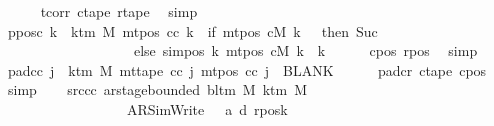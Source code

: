 \begin{isabellebody}
\ \ \ \ \isamarkupfalse%
\ tcorr\ c{\isacharunderscore}{\kern0pt}tape\ r{\isacharunderscore}{\kern0pt}tape\ \isamarkupfalse%
\ simp\isanewline
\ \ \isamarkupfalse%
\ ppos{\isacharunderscore}{\kern0pt}c{\isacharcolon}{\kern0pt}\ {\isachardoublequoteopen}{\isasymforall}k\ {\isacharless}{\kern0pt}\ k{\isacharunderscore}{\kern0pt}tm\ M{\isachardot}{\kern0pt}\ mt{\isacharunderscore}{\kern0pt}pos\ c{\isacharunderscore}{\kern0pt}c\ k\ {\isacharequal}{\kern0pt}\ {\isacharparenleft}{\kern0pt}if\ mt{\isacharunderscore}{\kern0pt}pos\ cM\ k\ {\isacharequal}{\kern0pt}\ {}\ then\ Suc\ {}\isanewline
\ \ \ \ \ \ \ \ \ \ \ \ \ \ \ \ \ \ \ else\ sim{\isacharunderscore}{\kern0pt}pos\ {\isacharquery}{\kern0pt}k\ {\isacharparenleft}{\kern0pt}mt{\isacharunderscore}{\kern0pt}pos\ cM\ k{\isacharparenright}{\kern0pt}\ {\isacharplus}{\kern0pt}\ {\isacharquery}{\kern0pt}k{\isacharparenright}{\kern0pt}{\isachardoublequoteclose}\isanewline
\ \ \ \ \isamarkupfalse%
\ c{\isacharunderscore}{\kern0pt}pos\ r{\isacharunderscore}{\kern0pt}pos\ \isamarkupfalse%
\ simp\isanewline
\ \ \isamarkupfalse%
\ pad{\isacharunderscore}{\kern0pt}cc{\isacharcolon}{\kern0pt}\ {\isachardoublequoteopen}{\isasymforall}j\ {\isasymge}\ k{\isacharunderscore}{\kern0pt}tm\ M{\isachardot}{\kern0pt}\ mt{\isacharunderscore}{\kern0pt}tape\ c{\isacharunderscore}{\kern0pt}c\ j\ {\isacharparenleft}{\kern0pt}mt{\isacharunderscore}{\kern0pt}pos\ c{\isacharunderscore}{\kern0pt}c\ j{\isacharparenright}{\kern0pt}\ {\isacharequal}{\kern0pt}\ BLANK{}{\isachardoublequoteclose}\isanewline
\ \ \ \ \isamarkupfalse%
\ pad{\isacharunderscore}{\kern0pt}cr\ c{\isacharunderscore}{\kern0pt}tape\ c{\isacharunderscore}{\kern0pt}pos\ \isamarkupfalse%
\ simp\isanewline
\ \ \isamarkupfalse%
\ src{\isacharunderscore}{\kern0pt}cc{\isacharcolon}{\kern0pt}\ {\isachardoublequoteopen}ar{\isacharunderscore}{\kern0pt}stage{\isacharunderscore}{\kern0pt}bounded\ {\isacharparenleft}{\kern0pt}bl{\isacharunderscore}{\kern0pt}tm\ M{\isacharparenright}{\kern0pt}\ {\isacharparenleft}{\kern0pt}k{\isacharunderscore}{\kern0pt}tm\ M{\isacharparenright}{\kern0pt}\isanewline
\ \ \ \ \ \ \ \ \ \ \ \ \ \ \ \ \ \ {\isacharparenleft}{\kern0pt}AR{\isacharunderscore}{\kern0pt}SimWrite{\isacharcomma}{\kern0pt}\ {}{\isacharcomma}{\kern0pt}\ {}{\isacharcomma}{\kern0pt}\ a{\isacharprime}{\kern0pt}{\isacharcomma}{\kern0pt}\ d{\isacharcomma}{\kern0pt}\ {\isacharquery}{\kern0pt}rposk{\isacharparenright}{\kern0pt}{\isachardoublequoteclose}\isanewline

\end{isabellebody}
